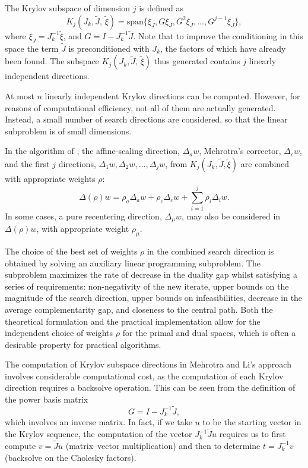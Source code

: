 The Krylov subspace of dimension $j$ is defined as
\[
K_j (J_k, \tilde J, \, \tilde \xi) =
{\mbox{span}} \{ \xi_J, G \xi_J, G^2 \xi_J, \dots,  G^{j-1} \xi_J \}, 
\]
where $\xi_J = J_k^{-1} \tilde \xi$, and $G = I - J_k^{-1} \tilde J$. 
Note that to improve the conditioning in this space
the term $\tilde J$ is preconditioned with $J_k$, 
the factors of which have already been found.
The subspace $K_j (J_k, \tilde J, \, \tilde \xi)$
thus generated contains $j$ linearly independent directions. 

At most $n$ linearly independent Krylov directions can be
computed. However, for reasons of computational efficiency, 
not all of them are actually generated. Instead, a small number
of search directions are considered, so that the linear subproblem 
is of small dimensions.

In the algorithm of \cite{MehrotraLi}, the affine-scaling
direction, $\Delta_a w$, Mehrotra's corrector, $\Delta_c w$, and
the first $j$ directions, $\Delta_1 w, \Delta_2 w, \dots, \Delta_j w$,
from $K_j (J_k, \tilde J, \tilde \xi)$ are 
combined with appropriate weights $\rho$:
\[
\Delta(\rho) w = \rho_a\Delta_a w + \rho_c\Delta_c w
               + \sum_{i=1}^j \rho_i \Delta_i w.
\]
In some cases, a pure recentering direction, $\Delta_\mu w$, may also
be considered in $\Delta(\rho) w$, with appropriate weight $\rho_\mu$.

The choice of the best set of weights $\rho$ in the combined search 
direction is obtained by solving an auxiliary linear programming 
subproblem. The subproblem maximizes the rate of decrease 
in the duality gap whilst satisfying a series of requirements:
non-negativity of the new iterate,
upper bounds on the magnitude of the search direction,
upper bounds on infeasibilities,
decrease in the average complementarity gap,
and closeness to the central path.
Both the theoretical formulation and the practical implementation 
allow for the independent choice of weights $\rho$ for the primal 
and dual spaces, which is often a desirable property for
practical algorithms.

The computation of Krylov subspace directions in Mehrotra and Li's 
approach involves considerable computational cost, as
the computation of each Krylov direction requires a backsolve operation. 
This can be seen from the definition of the power basis matrix
\[
  G = I - J_k^{-1}\tilde J,
\]
which involves an inverse matrix. In fact, if we take $u$
to be the starting vector 
in the Krylov sequence, the computation of the vector $ J_k^{-1}\tilde Ju$ 
requires us to first compute $v = \tilde Ju$ (matrix--vector multiplication) 
and then to determine $t=J_k^{-1}v$ (backsolve on the Cholesky factors).

